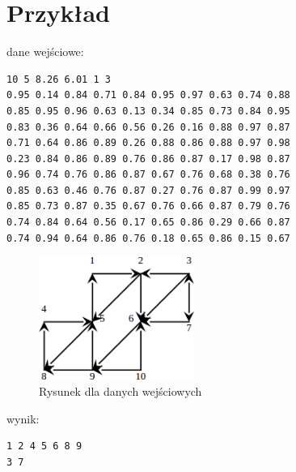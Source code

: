\documentclass{article}
\begin{document}
\newpage
\section*{Przykład}
dane wejściowe:
\begin{verbatim}
10 5 8.26 6.01 1 3
0.95 0.14 0.84 0.71 0.84 0.95 0.97 0.63 0.74 0.88
0.85 0.95 0.96 0.63 0.13 0.34 0.85 0.73 0.84 0.95
0.83 0.36 0.64 0.66 0.56 0.26 0.16 0.88 0.97 0.87
0.71 0.64 0.86 0.89 0.26 0.88 0.86 0.88 0.97 0.98
0.23 0.84 0.86 0.89 0.76 0.86 0.87 0.17 0.98 0.87
0.96 0.74 0.76 0.86 0.87 0.67 0.76 0.68 0.38 0.76
0.85 0.63 0.46 0.76 0.87 0.27 0.76 0.87 0.99 0.97
0.85 0.73 0.87 0.35 0.67 0.76 0.66 0.87 0.79 0.76
0.74 0.84 0.64 0.56 0.17 0.65 0.86 0.29 0.66 0.87
0.74 0.94 0.64 0.86 0.76 0.18 0.65 0.86 0.15 0.67
\end{verbatim}
\begin{figure}
  \begin{center}
    \includegraphics[width=2in]{B2.png}
  \end{center}
  \caption{Rysunek dla danych wejściowych}
  \label{fig:two}
\end{figure}
wynik:
\begin{verbatim}
1 2 4 5 6 8 9
3 7
\end{verbatim}
\end{document}
